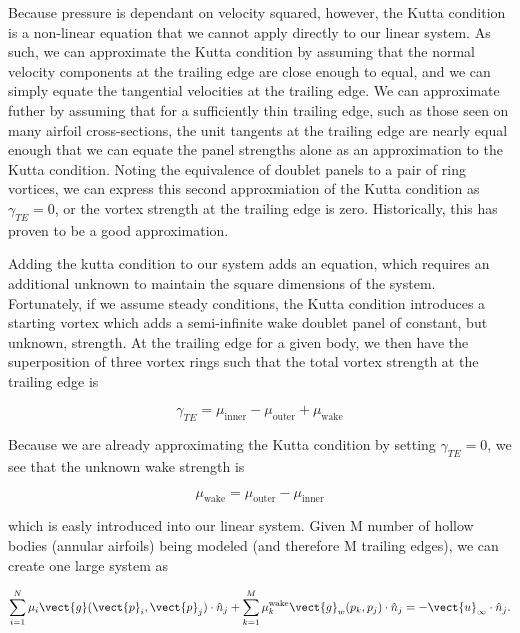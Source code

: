 Because pressure is dependant on velocity squared, however, the Kutta condition is a non-linear equation that we cannot apply directly to our linear system.
As such, we can approximate the Kutta condition by assuming that the normal velocity components at the trailing edge are close enough to equal, and we can simply equate the tangential velocities at the trailing edge.
We can approximate futher by assuming that for a sufficiently thin trailing edge, such as those seen on many airfoil cross-sections, the unit tangents at the trailing edge are nearly equal enough that we can equate the panel strengths alone as an approximation to the Kutta condition.
Noting the equivalence of doublet panels to a pair of ring vortices, we can express this second approxmiation of the Kutta condition as \(\gamma_{TE} = 0\), or the vortex strength at the trailing edge is zero.
Historically, this has proven to be a good approximation.

Adding the kutta condition to our system adds an equation, which requires an additional unknown to maintain the square dimensions of the system.
Fortunately, if we assume steady conditions, the Kutta condition introduces a starting vortex which adds a semi-infinite wake doublet panel of constant, but unknown, strength.
At the trailing edge for a given body, we then have the superposition of three vortex rings such that the total vortex strength at the trailing edge is

\begin{equation}
    \gamma_{TE} = \mu_\text{inner} - \mu_\text{outer} + \mu_\text{wake}
\end{equation}

\noindent Because we are already approximating the Kutta condition by setting \(\gamma_{TE}=0\), we see that the unknown wake strength is

\begin{equation}
    \mu_\text{wake}= \mu_\text{outer} - \mu_\text{inner}
\end{equation}

\noindent which is easly introduced into our linear system.
Given M number of hollow bodies (annular airfoils) being modeled (and therefore M trailing edges), we can create one large system as

\begin{equation}
    \sum_{i=1}^N \mu_i \vect{g}(\vect{p}_i,\vect{p}_j) \cdot \hat{n}_j
    + \sum_{k=1}^M \mu^\text{wake}_k \vect{g}_{w}(p_k, p_j) \cdot \hat{n}_j
        = - \vect{u}_\infty \cdot \hat{n}_j.
\end{equation}

